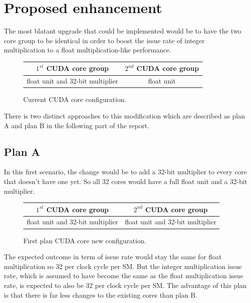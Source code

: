 \documentclass{report}
\begin{document}
   \section{Proposed enhancement}
   The most blatant upgrade that could be implemented would be to have the two core group to be identical in order to boost the issue rate of integer multiplication to a float multiplication-like performance.
   \begin{figure}[H]
      \centering
       \begin{tabular}{ | c | c | }
    	    \hline
    	    $1^{st}$ CUDA core group & $2^{nd}$ CUDA core group \\ \hline
    	   float unit and 32-bit multiplier & float unit \\ \hline
  	\end{tabular}
  	\captionsetup{justification=centering}
  	\caption{Current CUDA core configuration.}
  	\label{fig:current_cores}
   \end{figure}
   There is two distinct approaches to this modification which are described as plan A and plan B in the following part of the report.
   \subsection{Plan A}
    In this first scenario, the change would be to add a 32-bit multiplier to every core that doesn't have one yet. So all 32 cores would have a full float unit and a 32-bit multiplier.
    \begin{figure}[H]
      \centering
       \begin{tabular}{ | c | c | }
    	    \hline
    	    $1^{st}$ CUDA core group & $2^{nd}$ CUDA core group \\ \hline
    	   float unit and 32-bit multiplier & float unit and 32-bit multiplier \\ \hline
  	\end{tabular}
  	\captionsetup{justification=centering}
  	\caption{First plan CUDA core new configuration.}
  	\label{fig:planA_cores}
   \end{figure}
    The expected outcome in term of issue rate would stay the same for float multiplication so 32 per clock cycle per SM. But the integer multiplication issue rate, which is assumed to have become the same as the float multiplication issue rate, is expected to also be 32 per clock cycle per SM.
    The advantage of this plan is that there is far less changes to the existing cores than plan B.
\end{document}

